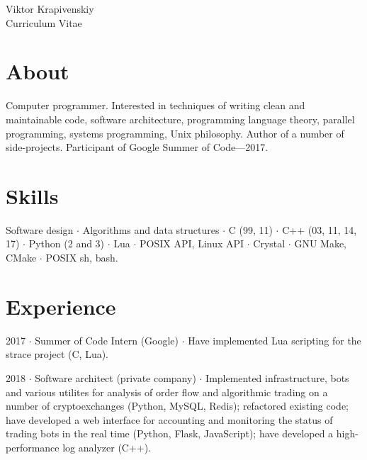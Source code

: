\documentclass[10pt]{article}
\begin{document}
\parbox[top][0.12\textheight][c]{\linewidth}{
    \vspace{-0.04\textheight}
    \centering
    {\sffamily\Huge Viktor Krapivenskiy}\\\medskip
    {\Huge Curriculum Vitae}
}

\medskip

\section{About}

Computer programmer.
Interested in
  techniques of writing clean and maintainable code,
  software architecture,
  programming language theory,
  parallel programming,
  systems programming,
  Unix philosophy.
Author of a number of side-projects.
Participant of Google Summer of Code---2017.

\medskip

\section{Skills}

Software design $\cdot$
Algorithms and data structures $\cdot$
C (99, 11) $\cdot$
C++ (03, 11, 14, 17) $\cdot$
Python (2 and 3) $\cdot$
Lua $\cdot$
POSIX API, Linux API $\cdot$
Crystal $\cdot$
GNU Make, CMake $\cdot$
POSIX sh, bash.

\medskip

%

\medskip

\section{Experience}

2017 $\cdot$ Summer of Code Intern (Google) $\cdot$ Have implemented Lua scripting for the strace project (C, Lua).

\medskip

2018 $\cdot$ Software architect (private company) $\cdot$ Implemented infrastructure, bots and various utilites for analysis of order flow and algorithmic trading on a number of cryptoexchanges (Python, MySQL, Redis);
refactored existing code;
have developed a web interface for accounting and monitoring the status of trading bots in the real time (Python, Flask, JavaScript);
have developed a high-performance log analyzer (C++).
\end{document}
